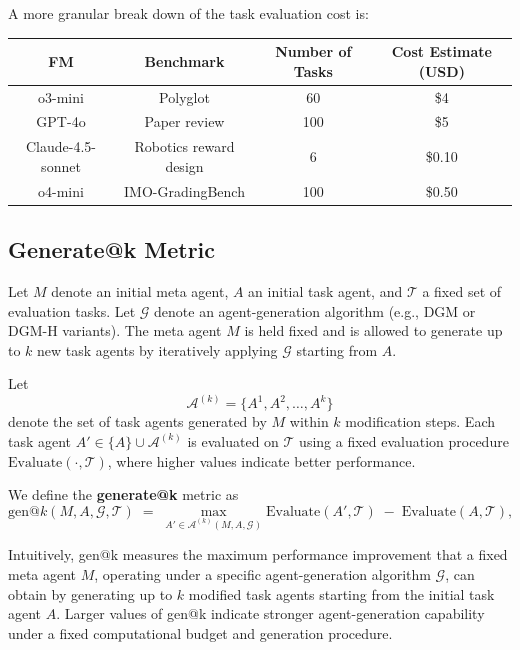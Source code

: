 \documentclass[]{fairmeta}
\begin{document}
A more granular break down of the task evaluation cost is:

\begin{table}[H]
\centering
\begin{tabular}{@{}cccc@{}}
\toprule
\textbf{FM} & \textbf{Benchmark} & \textbf{Number of Tasks} & \textbf{Cost Estimate (USD)} \\ \midrule
o3-mini & Polyglot & 60 & \$4 \\
GPT-4o & Paper review & 100 & \$5 \\
Claude-4.5-sonnet & Robotics reward design & 6 & \$0.10 \\
o4-mini & IMO-GradingBench & 100 & \$0.50 \\ \bottomrule
\end{tabular}
\end{table}

\subsection{Generate@k Metric}
\label{app:genk-metric}

Let $M$ denote an initial meta agent, $A$ an initial task agent, and $\mathcal{T}$ a fixed set of evaluation tasks. Let $\mathcal{G}$ denote an agent-generation algorithm (e.g., DGM or DGM-H variants). The meta agent $M$ is held fixed and is allowed to generate up to $k$ new task agents by iteratively applying $\mathcal{G}$ starting from $A$.

Let
\[
\mathcal{A}^{(k)} = \{A^{1}, A^{2}, \dots, A^{k}\}
\]
denote the set of task agents generated by $M$ within $k$ modification steps. Each task agent
$A' \in \{A\} \cup \mathcal{A}^{(k)}$ is evaluated on $\mathcal{T}$ using a fixed evaluation
procedure $\mathrm{Evaluate}(\cdot, \mathcal{T})$, where higher values indicate better performance.

We define the \textbf{generate@k} metric as
\[
\mathrm{gen@}k(M, A, \mathcal{G}, \mathcal{T})
\;=\;
\max_{A' \in \mathcal{A}^{(k)}(M, A, \mathcal{G})}
\mathrm{Evaluate}(A', \mathcal{T})
\;-\;
\mathrm{Evaluate}(A, \mathcal{T}),
\]

Intuitively, gen@k measures the maximum performance improvement that a fixed meta agent $M$, operating under a specific agent-generation algorithm $\mathcal{G}$, can obtain by generating up to $k$ modified task agents starting from the initial task agent $A$. Larger values of gen@k indicate stronger agent-generation capability under a fixed computational budget and generation procedure.
\end{document}
